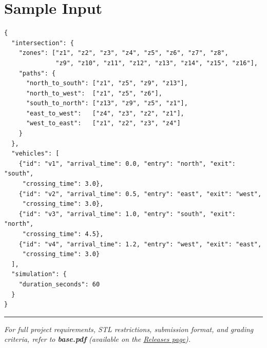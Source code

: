 \section{Sample Input}

\begin{lstlisting}[style=json]
{
  "intersection": {
    "zones": ["z1", "z2", "z3", "z4", "z5", "z6", "z7", "z8",
              "z9", "z10", "z11", "z12", "z13", "z14", "z15", "z16"],
    "paths": {
      "north_to_south": ["z1", "z5", "z9", "z13"],
      "north_to_west":  ["z1", "z5", "z6"],
      "south_to_north": ["z13", "z9", "z5", "z1"],
      "east_to_west":   ["z4", "z3", "z2", "z1"],
      "west_to_east":   ["z1", "z2", "z3", "z4"]
    }
  },
  "vehicles": [
    {"id": "v1", "arrival_time": 0.0, "entry": "north", "exit": "south",
     "crossing_time": 3.0},
    {"id": "v2", "arrival_time": 0.5, "entry": "east", "exit": "west",
     "crossing_time": 3.0},
    {"id": "v3", "arrival_time": 1.0, "entry": "south", "exit": "north",
     "crossing_time": 4.5},
    {"id": "v4", "arrival_time": 1.2, "entry": "west", "exit": "east",
     "crossing_time": 3.0}
  ],
  "simulation": {
    "duration_seconds": 60
  }
}
\end{lstlisting}

\vfill
\noindent\rule{\textwidth}{0.4pt}
{\small\textit{For full project requirements, STL restrictions, submission format, and grading criteria, refer to \textbf{base.pdf} (available on the \href{https://github.com/BestSithInEU/cse211-term-projects/releases}{Releases page}).}}
